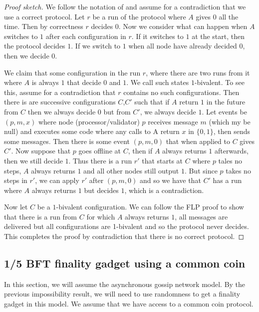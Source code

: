 \documentclass{article}
\begin{document}
\begin{proof}[Proof sketch] We follow the notation of  \cite{flp} and assume for a contradiction that we use a correct protocol. 
Let $r$ be a run of the protocol where $A$ gives $0$ all the time.
Then by correctness $r$ decides $0$. Now we consider what can happen when $A$ switches to $1$ after each configuration in $r$. If it switches to $1$ at the start, then the protocol decides $1$.
If we switch to $1$ when all node have already decided $0$, then we decide $0$.

We claim that some configuration in the run $r$, where there are two runs from it where $A$ is always $1$ that decide $0$ and $1$. We call such states $1$-bivalent.
To see this, assume for a contradiction that $r$ contains no such configurations. Then there is are successive configurations $C$,$C'$ such that if $A$ return $1$ in the future from $C$ then we always decide $0$ but from $C'$, we always decide $1$.
Let events be $(p,m,x)$ where node (processor/validator) $p$ receives message $m$ (which my be null) and executes some code where any calls to A return $x$ in $\{0,1\}$, then sends some messages. 
Then there is some event $(p,m,0)$ that when applied to $C$ gives $C'$. Now suppose that $p$ goes offline at $C$, then if $A$ always returns $1$ afterwards, then we still decide $1$. Thus there is a run $r'$ that starts at $C$ where $p$ tales no steps, $A$ always returns $1$ and all other nodes still output $1$.
But since $p$ takes no steps in $r'$, we can apply $r'$ after $(p, m, 0)$ and so we have that $C'$ has a run where $A$ always returns $1$ but decides $1$, which is a contradiction.

Now let $C$ be a $1$-bivalent configuration. We can follow the FLP proof to show that there is a run from $C$ for which $A$ always returns $1$, all messages are delivered but all configurations are 1-bivalent and so the protocol never decides. This completes the proof by contradiction that there is no correct protocol.
\end{proof}

\subsection{1/5 BFT finality gadget using a common coin}

In this section, we will assume the asynchronous gossip network model. By the previous impossibility result, we will need to use randomness to get a finality gadget in this model. We assume that we have access to a common coin protocol.
 
\end{document}
